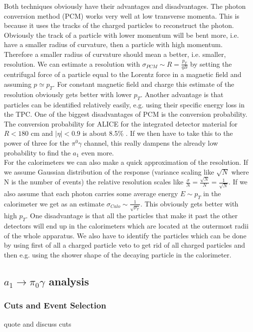 Both techniques obviously have their advantages and disadvantages. The photon conversion method (PCM) works very well at low transverse momenta. This is because it uses the tracks of the charged particles to reconstruct the photon. Obviously the track of a particle with lower momentum will be bent more, i.e. have a smaller radius of curvature, then a particle with high momentum. Therefore a smaller radius of curvature should mean a better, i.e. smaller, resolution. We can estimate a resolution with $\sigma_{PCM} \sim R = \frac{p_T}{qB}$ by setting the centrifugal force of a particle equal to the Lorentz force in a magnetic field and assuming $p \simeq p_T$. For constant magnetic field and charge this estimate of the resolution obviously gets better with lower $p_T$. Another advantage is that particles can be identified relatively easily, e.g. using their specific energy loss in the TPC. One of the biggest disadvantages of PCM is the conversion probability. The conversion probability for ALICE for the integrated detector material for $R<180$ cm and $|\eta|<0.9$ is about 8.5\% \cite{ALICEPerfRep}. If we then have to take this to the power of three for the $\pi^0\gamma$ channel, this really dampens the already low probability to find the $a_1$ even more. \\
For the calorimeters we can also make a quick approximation of the resolution. If we assume Gaussian distribution of the response (variance scaling like $\sqrt{N}$ where N is the number of events) the relative resolution scales like $\frac{\sigma}{N} = \frac{\sqrt{N}}{N} = \frac{1}{\sqrt{N}}$. If we also assume that each photon carries some average energy $E \sim p_T$ in the calorimeter we get as an estimate $\sigma_{Calo} \sim \frac{1}{\sqrt{p_T}}$. This obviously gets better with high $p_T$. One disadvantage is that all the particles that make it past the other detectors will end up in the calorimeters which are located at the outermost radii of the whole apparatus. We also have to identify the particles which can be done by using first of all a charged particle veto to get rid of all charged particles and then e.g. using the shower shape of the  decaying particle in the calorimeter.


\subsection{$a_1 \rightarrow \pi_0 \gamma$ analysis}
\subsubsection{Cuts and Event Selection}
quote and discuss cuts

